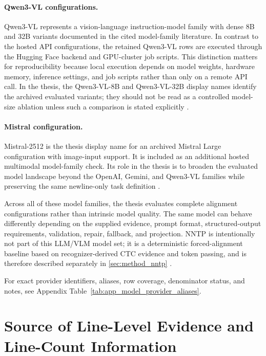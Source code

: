 \paragraph{Qwen3-VL configurations.}
Qwen3-VL represents a vision-language instruction-model family with dense 8B and 32B variants documented in the cited model-family literature. In contrast to the hosted API configurations, the retained Qwen3-VL rows are executed through the Hugging Face backend and GPU-cluster job scripts. This distinction matters for reproducibility because local execution depends on model weights, hardware memory, inference settings, and job scripts rather than only on a remote API call. In the thesis, the Qwen3-VL-8B and Qwen3-VL-32B display names identify the archived evaluated variants; they should not be read as a controlled model-size ablation unless such a comparison is stated explicitly .

\paragraph{Mistral configuration.}
Mistral-2512 is the thesis display name for an archived Mistral Large configuration with image-input support. It is included as an additional hosted multimodal model-family check. Its role in the thesis is to broaden the evaluated model landscape beyond the OpenAI, Gemini, and Qwen3-VL families while preserving the same newline-only task definition .

Across all of these model families, the thesis evaluates complete alignment configurations rather than intrinsic model quality. The same model can behave differently depending on the supplied evidence, prompt format, structured-output requirements, validation, repair, fallback, and projection. NNTP is intentionally not part of this LLM/VLM model set; it is a deterministic forced-alignment baseline based on recognizer-derived CTC evidence and token passing, and is therefore described separately in \autoref{sec:method_nntp} .

For exact provider identifiers, aliases, row coverage, denominator status, and notes, see Appendix Table~\ref{tab:app_model_provider_aliases}.

\FloatBarrier

\section{Source of Line-Level Evidence and Line-Count Information}
\label{sec:method_line_evidence_sources}

